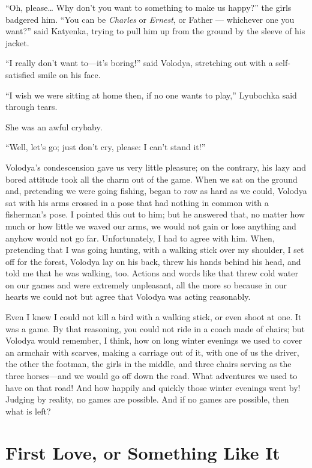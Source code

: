 ``Oh, please\ldots{} Why don't you want to something to make us happy?'' the girls badgered him. ``You can be \textit{Charles} or \textit{Ernest}, or Father --- whichever one you want?'' said Katyenka, trying to pull him up from the ground by the sleeve of his jacket. %

``I really don't want to---it's boring!'' said Volodya, stretching out with a self-satisfied smile on his face.

``I wish we were sitting at home then, if no one wants to play,'' Lyubochka said through tears. %

She was an awful crybaby.

``Well, let's go; just don't cry, please: I can't stand it!'' %

Volodya's condescension gave us very little pleasure; on the contrary, his lazy and bored attitude took all the charm out of the game. When we sat on the ground and, pretending we were going fishing, began to row as hard as we could, Volodya sat with his arms crossed in a pose that had nothing in common with a fisherman's pose. I pointed this out to him; but he answered that, no matter how much or how little we waved our arms, we would not gain or lose anything and anyhow would not go far. Unfortunately, I had to agree with him. When, pretending that I was going hunting, with a walking stick over my shoulder, I set off for the forest, Volodya lay on his back, threw his hands behind his head, and told me that he was walking, too. Actions and words like that threw cold water on our games and were extremely unpleasant, all the more so because in our hearts we could not but agree that Volodya was acting reasonably.

Even I knew I could not kill a bird with a walking stick, or even shoot at one. It was a game. By that reasoning, you could not ride in a coach made of chairs; but Volodya would remember, I think, how on long winter evenings we used to cover an armchair with scarves, making a carriage out of it, with one of us the driver, the other the footman, the girls in the middle, and three chairs serving as the three horses---and we would go off down the road. What adventures we used to have on that road! And how happily and quickly those winter evenings went by! Judging by reality, no games are possible. And if no games are possible, then what is left?

\chapter{First Love, or Something Like It}

